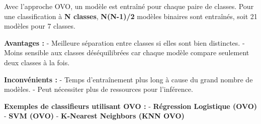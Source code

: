 \documentclass[
  letterpaper,
  DIV=11,
  numbers=noendperiod]{scrartcl}
\begin{document}
Avec l'approche OVO, un modèle est entraîné pour chaque paire de
classes. Pour une classification à \textbf{N classes}, \textbf{N(N-1)/2}
modèles binaires sont entraînés, soit 21 modèles pour 7 classes.

\textbf{Avantages :} - Meilleure séparation entre classes si elles sont
bien distinctes. - Moins sensible aux classes déséquilibrées car chaque
modèle compare seulement deux classes à la fois.

\textbf{Inconvénients :} - Temps d'entraînement plus long à cause du
grand nombre de modèles. - Peut nécessiter plus de ressources pour
l'inférence.

\textbf{Exemples de classifieurs utilisant OVO :} - \textbf{Régression
Logistique (OVO)} - \textbf{SVM (OVO)} - \textbf{K-Nearest Neighbors
(KNN OVO)}
\end{document}
